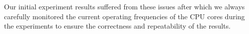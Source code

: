 Our initial experiment results suffered from these issues after which
we always carefully monitored the current operating frequencies of the
CPU cores during the experiments to ensure the correctness and
repeatability of the results.


